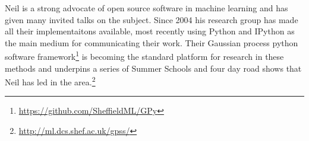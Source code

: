 Neil is a strong advocate of open source software in machine learning and has given many invited talks on the subject. Since 2004 his research group has made all their implementaitons available, most recently using Python and IPython as the main medium for communicating their work. Their Gaussian process python software framework\footnote{\url{https://github.com/SheffieldML/GPy}} is becoming the standard platform for research in these methods and underpins a series of Summer Schools and four day road shows that Neil has led in the area.\footnote{\url{http://ml.dcs.shef.ac.uk/gpss/}}
